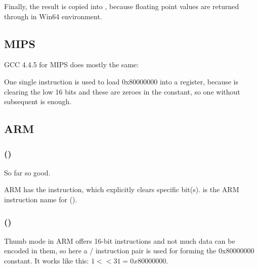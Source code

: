 Finally, the result is copied into , because floating point values are returned through  in Win64
environment.

\subsection{MIPS}

GCC 4.4.5 for MIPS does mostly the same:




One single \LUI instruction is used to load 0x80000000 into a register, because 
\LUI is clearing the low 16 bits and these are zeroes in the constant, so one \LUI without subsequent \ORI is enough.

\subsection{ARM}

\subsubsection{\OptimizingKeilVI (\ARMMode)}



So far so good.

ARM has the \BIC instruction, which explicitly clears specific bit(s).
\EOR is the ARM instruction name for \XOR 
().

\subsubsection{\OptimizingKeilVI (\ThumbMode)}



Thumb mode in ARM offers 16-bit instructions and not much data can be encoded in them, so here a 
/ instruction pair is used for forming the 0x80000000 constant.
It works like this: $1<<31 = 0x80000000$.


